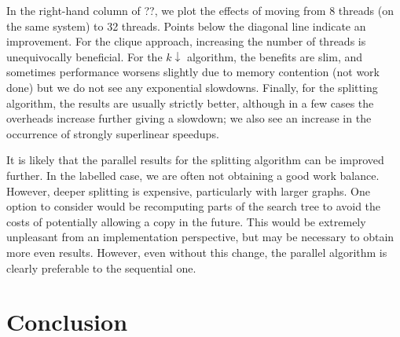 \documentclass[sigconf]{acmart}
\begin{document}
In the right-hand column of ??, we plot the effects of moving from 8
threads (on the same system) to 32 threads. Points below the diagonal line indicate an improvement.
For the clique approach, increasing the number of threads is unequivocally beneficial. For the
$k{\downarrow}$ algorithm, the benefits are slim, and sometimes performance worsens slightly due to
memory contention (not work done) but we do not see any exponential slowdowns. Finally, for the
splitting algorithm, the results are usually strictly better, although in a few cases the overheads
increase further giving a slowdown; we also see an increase in the occurrence of strongly
superlinear speedups.

It is likely that the parallel results for the splitting algorithm can be improved further. In the
labelled case, we are often not obtaining a good work balance. However, deeper splitting is
expensive, particularly with larger graphs. One option to consider would be recomputing parts of the
search tree to avoid the costs of potentially allowing a copy in the future. This would be extremely
unpleasant from an implementation perspective, but may be necessary to obtain more even results.
However, even without this change, the parallel algorithm is clearly preferable to the sequential
one.

\section{Conclusion}



\end{document}
